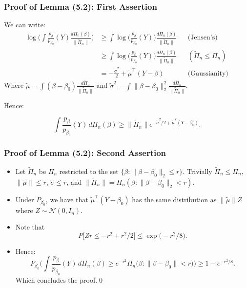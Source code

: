 \documentclass[usenames,dvipsnames]{beamer}
\renewcommand{\b}{\beta}
\newcommand{\s}{\sigma}
\newcommand{\te}{\beta}
\newcommand{\q}{\beta}
\newcommand{\m}{\mu}
\begin{document}
\begin{frame}
\frametitle{Proof of Lemma (5.2): First Assertion}
\begin{small}
We can write:
\begin{align*}
\log\bigg(\int \frac{p_\beta}{p_{\beta_0}}(Y) \frac{d \Pi_n(\beta)}{\|\tilde \Pi_n\|}\bigg) &\geq \int \log\bigg(\frac{p_\beta}{p_{\beta_0}}(Y)\bigg) \frac{d \Pi_n(\beta)}{\|\tilde \Pi_n\|} && \text{(Jensen's)}\\
&\geq \int \log\bigg(\frac{p_\beta}{p_{\beta_0}}(Y)\bigg) \frac{d \tilde \Pi_n(\beta)}{\|\tilde \Pi_n\|}&& (\tilde\Pi_n \leq \Pi_n)\\
&= -\frac{\tilde\sigma^2}{2} + \tilde \mu^\top (Y-\b) && \text{(Gaussianity)}
\end{align*}
Where $\tilde\mu = \int (\b - \b_0) \frac{d\tilde\Pi_n}{\|\tilde\Pi_n\|}$ and  $\tilde\sigma^2 = \int \|\b - \b_0\|^2_2 \frac{d\tilde\Pi_n}{\|\tilde\Pi_n\|}$. 

Hence:

\[
\int\frac{p_{\q}}{p_{\q_0}}(Y) \,d\Pi_n(\q) \ge\|\tilde\Pi_n\|
e^{-\tilde
	\s^2/2+\tilde\m^T(Y-\q_0) }.
\]
\end{small}
\end{frame}

\begin{frame}
	\frametitle{Proof of Lemma (5.2): Second Assertion}
	\begin{small}
		\begin{itemize}

			\item
			Let $\tilde \Pi_n$ be  $\Pi_n$ restricted to the set $\{\b: \|\b-\b_0\|_2\leq r\}$. Trivially $\tilde\Pi_n \leq \Pi_n$, $\|\tilde\mu\| \leq r$, $\tilde\sigma \leq r$, and $\|\tilde \Pi_n\| = \Pi_n(\q:\|\q-\q_0\|_2<r)$.
			\item
			Under $P_{\b_0}$, we have that ${\tilde\mu}^\top (Y-\b_0)$ has the same distribution as  $\|\tilde \mu\|Z$ where $Z\sim\mathcal{N}(0, I_n)$. 
			\item
			Note that 
			\begin{equation*}
				P\bigg[Zr\leq -r^2 + r^2/2\bigg] \leq \exp\big(-r^2/8\big).
			\end{equation*}
			\item Hence:			
			\[
			P_{\q_0} \biggl(\int\frac{p_{\te}}{p_{\te_0}}(Y) \,d\Pi_n(\te) \geq e^{-r^2}
			\Pi_n\bigl(\q:\|\q-\q_0\|<r \bigr) \biggr)\geq1 - e^{-r^2/8}.
			\] 
			Which concludes the proof.\qed
		\end{itemize}
	\end{small}
\end{frame}
\end{document}
